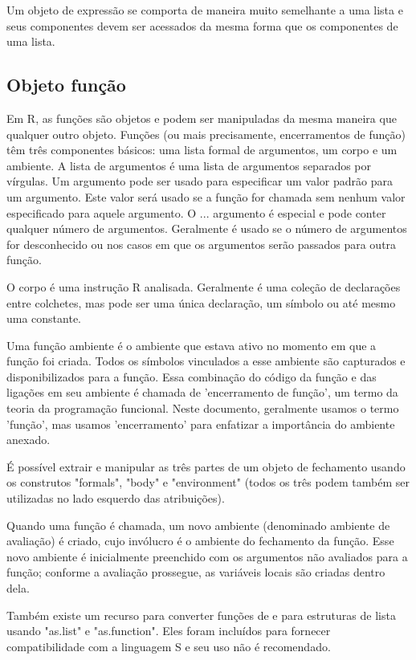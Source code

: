       Um objeto de expressão se comporta de maneira muito semelhante a uma lista e seus componentes devem ser acessados da mesma forma que os componentes de uma lista.
    
    \subsection{Objeto função}
      Em R, as funções são objetos e podem ser manipuladas da mesma maneira que qualquer outro objeto. Funções (ou mais precisamente, encerramentos de função) têm três componentes básicos: uma lista formal de argumentos, um corpo e um ambiente. A lista de argumentos é uma lista de argumentos separados por vírgulas. Um argumento pode ser usado para especificar um valor padrão para um argumento. Este valor será usado se a função for chamada sem nenhum valor especificado para aquele argumento. O ... argumento é especial e pode conter qualquer número de argumentos. Geralmente é usado se o número de argumentos for desconhecido ou nos casos em que os argumentos serão passados para outra função.
      
      O corpo é uma instrução R analisada. Geralmente é uma coleção de declarações entre colchetes, mas pode ser uma única declaração, um símbolo ou até mesmo uma constante.
      
      Uma função ambiente é o ambiente que estava ativo no momento em que a função foi criada. Todos os símbolos vinculados a esse ambiente são capturados e disponibilizados para a função. Essa combinação do código da função e das ligações em seu ambiente é chamada de 'encerramento de função', um termo da teoria da programação funcional. Neste documento, geralmente usamos o termo 'função', mas usamos 'encerramento' para enfatizar a importância do ambiente anexado.
      
      É possível extrair e manipular as três partes de um objeto de fechamento usando os construtos "formals", "body" e "environment" (todos os três podem também ser utilizadas no lado esquerdo das atribuições).
      
      Quando uma função é chamada, um novo ambiente (denominado ambiente de avaliação) é criado, cujo invólucro é o ambiente do fechamento da função. Esse novo ambiente é inicialmente preenchido com os argumentos não avaliados para a função; conforme a avaliação prossegue, as variáveis locais são criadas dentro dela.
      
      Também existe um recurso para converter funções de e para estruturas de lista usando "as.list" e "as.function". Eles foram incluídos para fornecer compatibilidade com a linguagem S e seu uso não é recomendado.
    
